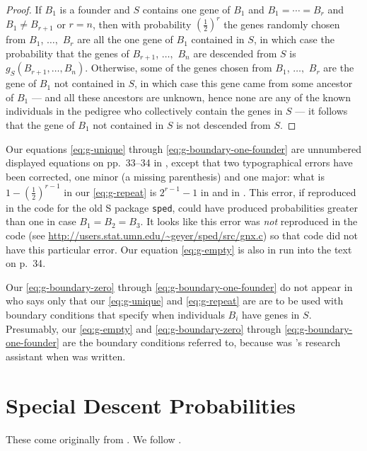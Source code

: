 \documentclass[11pt]{article}
\begin{document}
\begin{proof}
If $B_1$ is a founder and $S$ contains one gene of $B_1$
and $B_1 = \cdots = B_r$ and $B_1 \neq B_{r + 1}$ or $r = n$, then
with probability $(\tfrac{1}{2})^r$ the genes randomly chosen from
$B_1$, $\ldots,$ $B_r$ are all the one gene of $B_1$ contained in $S$,
in which case the probability that the genes of $B_{r + 1}$, $\ldots,$ $B_n$
are descended from $S$ is $g_S(B_{r + 1}, \ldots, B_n)$.
Otherwise, some of the genes chosen from $B_1$, $\ldots,$ $B_r$ are the
gene of $B_1$ not contained in $S$, in which case this gene came from some
ancestor of $B_1$ --- and all these ancestors are unknown, hence none
are any of the known individuals in the pedigree who collectively contain
the genes in $S$ --- it follows that the gene of $B_1$ not contained in $S$
is not descended from $S$.
\end{proof}

Our equations \eqref{eq:g-unique} through \eqref{eq:g-boundary-one-founder}
are unnumbered displayed equations on pp.~{33--34} in \citet{geyer},
except that two typographical errors have been corrected, one minor (a missing
parenthesis) and one major: what is $1 - (\tfrac{1}{2})^{r - 1}$
in our \eqref{eq:g-repeat} is $2^{r - 1} - 1$ in \citet{geyer} and in
\citet[equation (7)]{thompson}.  This error, if reproduced in the code
for the old S package \texttt{sped}, could have produced probabilities greater
than one in case $B_1 = B_2 = B_3$.  It looks like this error was \emph{not}
reproduced in the code
(see \url{http://users.stat.umn.edu/~geyer/sped/src/gnx.c})
so that code did not have this particular error.
Our equation \eqref{eq:g-empty} is also in \citet{geyer} run into the text
on p.~{34}.

Our \eqref{eq:g-boundary-zero} through \eqref{eq:g-boundary-one-founder}
do not appear in \citet{thompson} who says only
that our \eqref{eq:g-unique} and \eqref{eq:g-repeat} are
are to be used with boundary conditions that specify when individuals
$B_i$ have genes in $S$.
Presumably,
our \eqref{eq:g-empty} and
\eqref{eq:g-boundary-zero} through \eqref{eq:g-boundary-one-founder}
are the boundary
conditions \citeauthor{thompson} referred to, because \citeauthor{geyer}
was \citeauthor{thompson}'s research assistant when \citet{geyer} was written.

\section{Special Descent Probabilities}

These come originally from \citet{thompson-1986}.  We follow \citet{geyer}.
\end{document}
